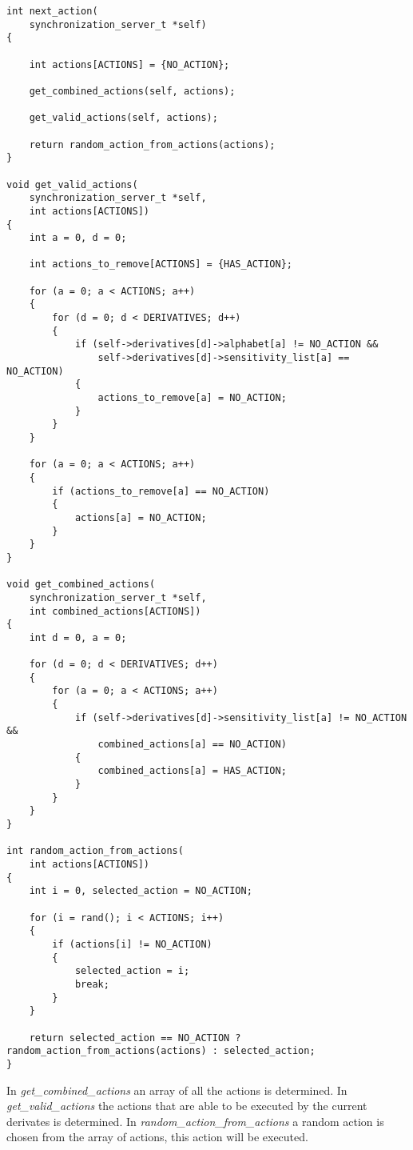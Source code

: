 \begin{verbatim}
int next_action(
    synchronization_server_t *self)
{

    int actions[ACTIONS] = {NO_ACTION};

    get_combined_actions(self, actions);

    get_valid_actions(self, actions);

    return random_action_from_actions(actions);
}

void get_valid_actions(
    synchronization_server_t *self,
    int actions[ACTIONS])
{
    int a = 0, d = 0;

    int actions_to_remove[ACTIONS] = {HAS_ACTION};

    for (a = 0; a < ACTIONS; a++)
    {
        for (d = 0; d < DERIVATIVES; d++)
        {
            if (self->derivatives[d]->alphabet[a] != NO_ACTION &&
                self->derivatives[d]->sensitivity_list[a] == NO_ACTION)
            {
                actions_to_remove[a] = NO_ACTION;
            }
        }
    }

    for (a = 0; a < ACTIONS; a++)
    {
        if (actions_to_remove[a] == NO_ACTION)
        {
            actions[a] = NO_ACTION;
        }
    }
}

void get_combined_actions(
    synchronization_server_t *self,
    int combined_actions[ACTIONS])
{
    int d = 0, a = 0;

    for (d = 0; d < DERIVATIVES; d++)
    {
        for (a = 0; a < ACTIONS; a++)
        {
            if (self->derivatives[d]->sensitivity_list[a] != NO_ACTION &&
                combined_actions[a] == NO_ACTION)
            {
                combined_actions[a] = HAS_ACTION;
            }
        }
    }
}

int random_action_from_actions(
    int actions[ACTIONS])
{
    int i = 0, selected_action = NO_ACTION;

    for (i = rand(); i < ACTIONS; i++)
    {
        if (actions[i] != NO_ACTION)
        {
            selected_action = i;
            break;
        }
    }

    return selected_action == NO_ACTION ? random_action_from_actions(actions) : selected_action;
}
\end{verbatim}

In \emph{get\_combined\_actions} an array of all the actions is
determined. In \emph{get\_valid\_actions} the actions that are able to
be executed by the current derivates is determined. In
\emph{random\_action\_from\_actions} a random action is chosen from the
array of actions, this action will be executed.


